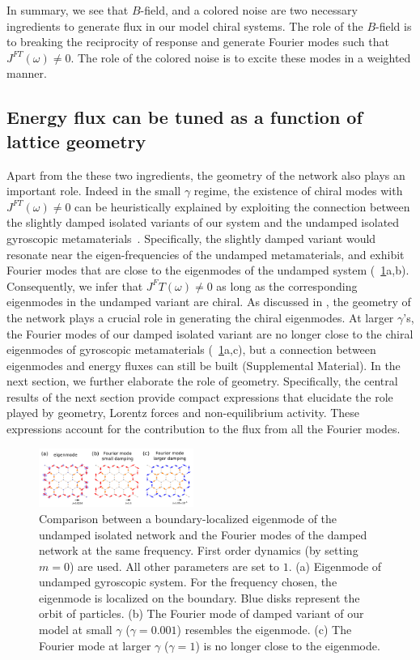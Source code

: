 \documentclass[
 preprint,
 preprintnumbers,
 amsmath,amssymb,
 aps,
 pre,
 longbibliography,
 superscriptaddress,
 10pt, twocolumn
]{revtex4-1}
\begin{document}
In summary, we see that $B$-field, and a colored noise are two necessary ingredients to generate flux in our model chiral systems.
The role of the $B$-field is to breaking the reciprocity of response and generate Fourier modes such that $J^{FT}(\omega)\neq 0$. The role of the colored noise is to excite these modes in a weighted manner.

\subsection{Energy flux can be tuned as a function of lattice geometry} 
Apart from the these two ingredients, the geometry of the network also plays an important role.
Indeed in the small $\gamma$ regime, the existence of chiral modes with $J^{FT}(\omega)\neq 0$ can be heuristically explained by exploiting the connection between the slightly damped isolated variants of our system and the undamped isolated gyroscopic metamaterials~\cite{Nash2015TopologicalMechanics,Mitchell2018AmorphousTopological}.
Specifically, the slightly damped variant would resonate near the eigen-frequencies of the undamped metamaterials, and exhibit Fourier modes that are close to the eigenmodes of the undamped system (\figurename~\ref{fig:Fourier_modes}a,b). Consequently, we infer that $J^FT(\omega)\neq 0$ as long as the corresponding eigenmodes in the undamped variant are chiral. As discussed in  \cite{Nash2015TopologicalMechanics}, the geometry of the network plays a crucial role in generating the chiral eigenmodes.
At larger $\gamma$'s, the Fourier modes of our damped isolated variant are no longer close to the chiral eigenmodes of gyroscopic metamaterials (\figurename~\ref{fig:Fourier_modes}a,c), but a connection between eigenmodes and energy fluxes can still be built (Supplemental Material).
In the next section, we further elaborate the role of geometry. Specifically, the central results of the next section provide compact expressions that elucidate the role played by geometry, Lorentz forces and non-equilibrium activity. These expressions account for the contribution to the flux from all the Fourier modes.

\begin{figure}[ht]
	\centering
	\includegraphics[width=0.45\textwidth]{2_Fourier_modes.pdf}
    \caption{Comparison between a boundary-localized eigenmode of the undamped isolated network and the Fourier modes of the damped network at the same frequency. First order dynamics (by setting $m=0$) are used. All other parameters are set to $1$.
    (a) Eigenmode of undamped gyroscopic system. For the frequency chosen, the eigenmode is localized on the boundary. Blue disks represent the orbit of particles.
    (b) The Fourier mode of damped variant of our model at small $\gamma$ ($\gamma=0.001$) resembles the eigenmode.
    (c) The Fourier mode at larger $\gamma$ ($\gamma=1$) is no longer close to the eigenmode.
    }
    \label{fig:Fourier_modes}
\end{figure}
\end{document}
